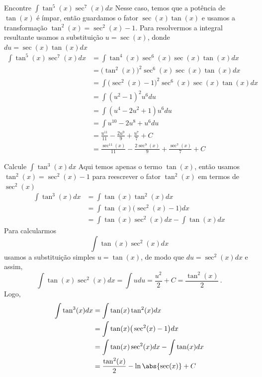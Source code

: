 \begin{example}
  Encontre \(\int \tan^5(x) \sec^7(x) dx\)
  \solution
  Nesse caso, temos que a potência de $\tan(x)$ é ímpar, então guardamos
  o fator $\sec(x)\tan(x)$ e usamos a transformação
  $\tan^2(x)= \sec^2(x)-1$.
  Para resolvermos a integral resultante usamos a substituição
  $u= \sec(x)$, donde $du= \sec(x)\tan(x)dx$
  \begin{align*}
    \int \tan^5(x) \sec^7(x) dx
    & = \int \tan^4(x) \sec^6(x) \sec(x) \tan(x) dx \\
    & = \big(\tan^2(x)\big)^2 \sec^6(x) \sec(x) \tan(x) dx \\
    & = \int \big(\sec^2(x)-1\big)^2\sec^6(x) \sec(x) \tan(x) dx \\
    & = \int \left(u^2-1\right)^2 u^6 du \\
    & = \int \left(u^4-2u^2+1\right)u^6 du \\
    & = \int u^{10}-2u^8+u^6 du \\
    & = \frac{u^{11}}{11}-\frac{2u^9}{9}+ \frac{u^7}{7}+C \\
    & = \frac{\sec^{11}(x)}{11}-\frac{2\sec^9(x)}{9}+ \frac{\sec^7(x)}{7}+C
  \end{align*}
\end{example}

\begin{example}
  Calcule \(\int \tan^3(x) dx\)
  \solution
  Aqui temos apenas o termo $\tan(x)$, então usamos
  $\tan^2(x)= \sec^2(x)-1$ para reescrever o fator
  $\tan^2(x)$ em termos de $\sec^2(x)$
  \begin{align*}
    \int \tan^3(x) dx
    & = \int \tan(x) \tan^2(x) dx \\
    & = \int \tan(x)\big(\sec^2(x)-1\big) dx \\
    & = \int \tan(x)\sec^2(x) dx- \int \tan(x) dx
  \end{align*}
  Para calcularmos
  \[
    \int \tan(x)\sec^2(x) dx
  \]
  usamos a substituição simples $u=\tan(x)$,
  de modo que $du= \sec^2(x)dx$ e assim,
  \[
    \int \tan(x)\sec^2(x) dx
    = \int udu
    = \frac{u^2}{2}+ C
    = \frac{\tan^2(x)}{2} \,.
  \]
  Logo,
  \begin{align*}
    \int \tan^3(x) dx
    & = \int \tan(x) \tan^2(x) dx \\
    & = \int \tan(x)\big(\sec^2(x)-1\big)dx \\
    & = \int \tan(x)\sec^2(x) dx- \int \tan(x) dx \\
    & = \frac{\tan^2(x)}{2}- \ln\abs{\sec(x)}+C
  \end{align*}
\end{example}

